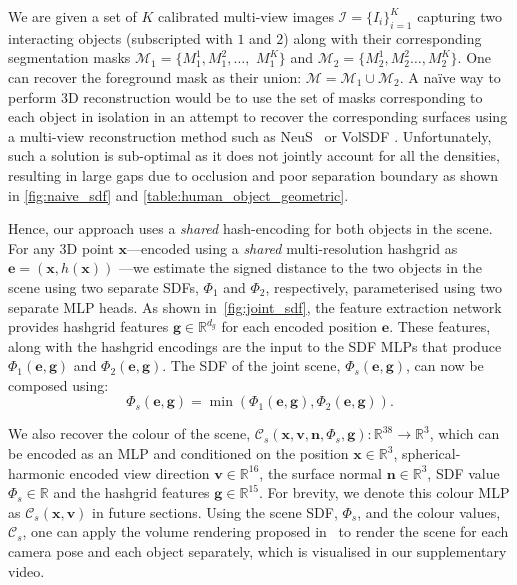 We are given a set of $K$ calibrated multi-view images $\mathcal{I} = \{I_i\}_{i=1}^K$ capturing two interacting objects (subscripted with $1$ and $2$) along with their corresponding segmentation masks $\mathcal{M}_1 = \{M_{1}^{1}, M_{1}^{2}, \hdots,$ $ M_{1}^{K}\}$ and $\mathcal{M}_2 = \{M_{2}^{1}, M_{2}^{2} \hdots, M_{2}^{K}\}$.
One can recover the foreground mask as their union: $\mathcal{M} = \mathcal{M}_1 \cup \mathcal{M}_2$. 
A na\"ive way to perform 3D reconstruction would be to use the set of masks corresponding to each object in isolation in an attempt to recover the corresponding surfaces using a multi-view reconstruction method such as NeuS~\cite{wang2021neus} or VolSDF \cite{yariv2021volume}. 
Unfortunately, such a solution is sub-optimal as it does not jointly account for all the densities, resulting in large gaps due to occlusion and poor separation boundary as shown in \cref{fig:naive_sdf} and \cref{table:human_object_geometric}. 
\par
Hence, our approach uses a \textit{shared} hash-encoding for both objects in the scene. 
For any 3D point $\mathbf{x}$---encoded using a \textit{shared} multi-resolution hashgrid as $\mathbf{e} = (\mathbf{x}, h(\mathbf{x}))$ 
---we estimate the signed distance to the two objects in the scene using two separate SDFs, $\Phi_1$ and $\Phi_2$, respectively, parameterised using two separate MLP heads. 
As shown in~\cref{fig:joint_sdf}, the feature extraction network provides hashgrid features $\mathbf{g} \in \mathbb{R}^{d_g}$ for each encoded position $\mathbf{e}$.
These features, along with the hashgrid encodings are the input to the SDF MLPs that produce $\Phi_1(\mathbf{e}, \mathbf{g})$ and $\Phi_2(\mathbf{e}, \mathbf{g})$.
The SDF of the joint scene, $\Phi_s(\mathbf{e}, \mathbf{g})$, can now be composed using:
\begin{equation}
\label{eq:union_sdf}
    \Phi_s(\mathbf{e}, \mathbf{g}) = \min(\Phi_1(\mathbf{e}, \mathbf{g}), \Phi_2(\mathbf{e}, \mathbf{g})). 
\end{equation}
\par
We also recover the colour of the scene, $\mathcal{C}_s(\mathbf{x}, \mathbf{v}, \mathbf{n}, \Phi_s, \mathbf{g}): \mathbb{R}^{38} \rightarrow \mathbb{R}^3$, which can be encoded as an MLP and conditioned on the position $\mathbf{x}\in \mathbb{R}^{3}$, spherical-harmonic encoded view direction $\mathbf{v}\in \mathbb{R}^{16}$, the surface normal $\mathbf{n}\in \mathbb{R}^{3}$, SDF value $\Phi_s\in \mathbb{R}$ and the hashgrid features $\mathbf{g} \in \mathbb{R}^{15}$. 
For brevity, we denote this colour MLP as $\mathcal{C}_s(\mathbf{x}, \mathbf{v})$ in future sections. 
Using the scene SDF, $\Phi_s$, and the colour values, $\mathcal{C}_s$, one can apply the volume rendering proposed in~\cite{wang2021neus} to render the scene for each camera pose and each object separately, which is
visualised in our supplementary video. 
